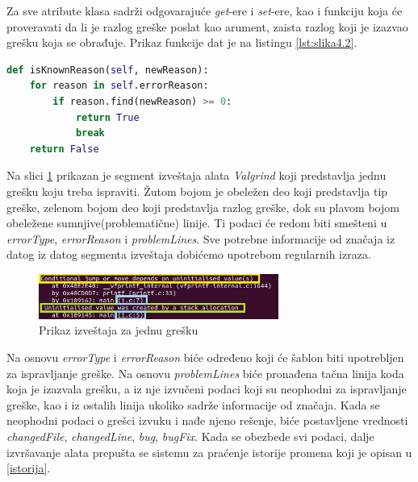 \documentclass[12pt,oneside]{memoir}
\theoremstyle{plain}
\theoremstyle{definition}
\begin{document}
Za sve atribute klasa sadrži odgovarajuće \textit{get}-ere i \textit{set}-ere, kao i funkciju koja će proveravati da li je razlog greške poslat kao arument, zaista razlog koji je izazvao grešku koja se obrađuje. Prikaz funkcije dat je na listingu \ref{lst:slika4.2}.

\begin{lstlisting}[caption={Prikaz funkcije koja proverava validnost razloga greške}, label={lst:slika4.2},language={Python}] 
def isKnownReason(self, newReason):
	for reason in self.errorReason:
		if reason.find(newReason) >= 0:
			return True
			break
	return False
\end{lstlisting}


Na slici \ref{fig:slika4.3} prikazan je segment izveštaja alata \textit{Valgrind} koji predstavlja jednu grešku koju treba ispraviti. Žutom bojom je obeležen deo koji predstavlja tip greške, zelenom bojom deo koji predstavlja razlog greške, dok su plavom bojom obeležene sumnjive(problematične) linije. Ti podaci će redom biti smešteni u \textit{errorType}, \textit{errorReason} i \textit{problemLines}. Sve potrebne informacije od značaja iz datog iz datog segmenta izveštaja dobićemo upotrebom regularnih izraza.

\begin{figure}[!ht]
  \centering
  \includegraphics[width=0.7\textwidth]{ErrorClassExplaination.png}
  \caption{Prikaz izveštaja za jednu grešku}
  \label{fig:slika4.3}
\end{figure}

Na osnovu \textit{errorType} i \textit{errorReason} biće određeno koji će šablon biti upotrebljen za ispravljanje greške. Na osnovu \textit{problemLines} biće pronađena tačna linija koda koja je izazvala grešku, a iz nje izvučeni podaci koji su neophodni za ispravljanje greške, kao i iz ostalih linija ukoliko sadrže informacije od značaja. Kada se neophodni podaci o grešci izvuku i nađe njeno rešenje, biće postavljene vrednosti \textit{changedFile}, \textit{changedLine}, \textit{bug}, \textit{bugFix}. Kada se obezbede svi podaci, dalje izvršavanje alata prepušta se sistemu za praćenje istorije promena koji je opisan u \ref{istorija}.
\end{document}
